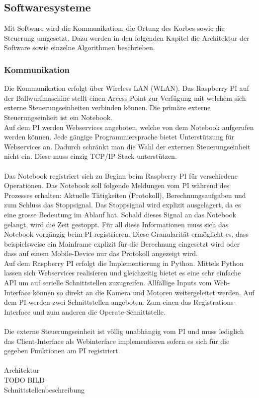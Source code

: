 \subsection{Softwaresysteme}
Mit Software wird die Kommunikation, die Ortung des Korbes sowie die Steuerung umgesetzt. Dazu werden in den folgenden Kapitel die Architektur der Software sowie einzelne Algorithmen beschrieben.

\subsubsection{Kommunikation}
Die Kommunikation erfolgt über Wireless LAN (WLAN). Das Raspberry PI auf der Ballwurfmaschine stellt einen Access Point zur Verfügung mit welchem sich externe Steuerungseinheiten verbinden können. Die primäre externe Steuerungseinheit ist ein Notebook.\\
Auf dem PI werden Webservices angeboten, welche von dem Notebook aufgerufen werden können. Jede gängige Programmiersprache bietet Unterstützung für Webservices an. Dadurch schränkt man die Wahl der externen Steuerungseinheit nicht ein. Diese muss einzig TCP/IP-Stack unterstützen.\\
\\
Das Notebook registriert sich zu Beginn beim Raspberry PI für verschiedene Operationen. Das Notebook soll folgende Meldungen vom PI während des Prozesses erhalten: Aktuelle Tätigkeiten (Protokoll), Berechnungsaufgaben und zum Schluss das Stoppsignal. Das Stoppsignal wird explizit ausgelagert, da es eine grosse Bedeutung im Ablauf hat. Sobald dieses Signal an das Notebook gelangt, wird die Zeit gestoppt. Für all diese Informationen muss sich das Notebook vorgängig beim PI registrieren. Diese Granularität ermöglicht es, dass beispielsweise ein Mainframe explizit für die Berechnung eingesetzt wird oder dass auf einem Mobile-Device nur das Protokoll angezeigt wird.
\\
Auf dem Raspberry PI erfolgt die Implementierung in Python. Mittels Python lassen sich Webservices realisieren und gleichzeitig bietet es eine sehr einfache API um auf serielle Schnittstellen zuzugreifen. Allfällige Inputs vom Web-Interface können so direkt an die Kamera und Motoren weitergeleitet werden. Auf dem PI werden zwei Schnittstellen angeboten. Zum einen das Registrations-Interface und zum anderen die Operate-Schnittstelle.\\
\\
Die externe Steuerungseinheit ist völlig unabhängig vom PI und muss lediglich das Client-Interface als Webinterface implementieren sofern es sich für die gegeben Funktionen am PI registriert.\\
\\
Architektur\\
TODO BILD
\\
Schnittstellenbeschreibung

